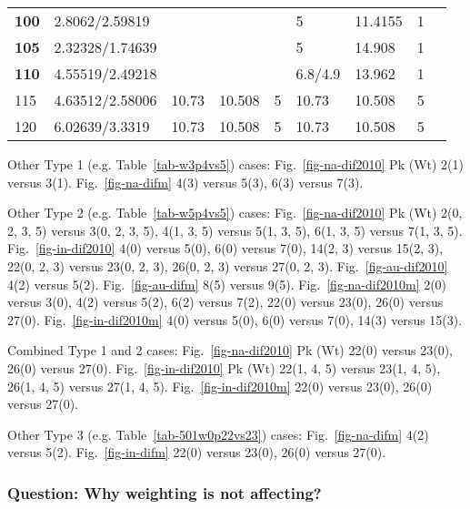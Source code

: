 \begin{table}[]
{\begin{tabular}{@{}llllllllll@{}}
\textbf{100} & 2.8062/2.59819 & \multicolumn{3}{l}{} & 5 & 11.4155 & 1 & \multicolumn{2}{l}{} \\
\textbf{105} & 2.32328/1.74639 & \multicolumn{3}{l}{} & 5 & 14.908 & 1 & \multicolumn{2}{l}{} \\
\textbf{110} & 4.55519/2.49218 & \multicolumn{3}{l}{} & 6.8/4.9 & 13.962 & 1 & \multicolumn{2}{l}{} \\
115 & 4.63512/2.58006 & 10.73 & 10.508 & 5 & 10.73 & 10.508 & 5 & \multicolumn{2}{l}{} \\
120 & 6.02639/3.3319 & 10.73 & 10.508 & 5 & 10.73 & 10.508 & 5 & \multicolumn{2}{l}{} \\ \cmidrule(r){1-8}
\end{tabular}%
}
\end{table}

Other Type 1 (e.g. Table~\ref{tab-w3p4vs5}) cases: Fig.~\ref{fig-na-dif2010}
Pk (Wt) 2(1) versus 3(1). Fig.~\ref{fig-na-difm} 4(3) versus 5(3), 6(3) versus 7(3).

Other Type 2 (e.g. Table~\ref{tab-w5p4vs5}) cases: Fig.~\ref{fig-na-dif2010}
Pk (Wt) 2(0, 2, 3, 5) versus 3(0, 2, 3, 5), 4(1, 3, 5) versus 5(1, 3, 5), 6(1,
3, 5) versus 7(1, 3, 5). Fig.~\ref{fig-in-dif2010} 4(0) versus 5(0),
6(0) versus 7(0), 14(2, 3) versus 15(2, 3), 22(0, 2, 3) versus 23(0, 2, 3),
26(0, 2, 3) versus 27(0, 2, 3). Fig.~\ref{fig-au-dif2010} 4(2) versus 5(2).
Fig.~\ref{fig-au-difm} 8(5) versus 9(5). Fig.~\ref{fig-na-dif2010m} 2(0)
versus 3(0), 4(2) versus 5(2), 6(2) versus 7(2), 22(0) versus
23(0), 26(0) versus 27(0).
Fig.~\ref{fig-in-dif2010m} 4(0) versus 5(0), 6(0)
versus 7(0), 14(3) versus 15(3).

Combined Type 1 and 2 cases: Fig.~\ref{fig-na-dif2010} Pk (Wt)
22(0) versus 23(0), 26(0) versus 27(0).
Fig.~\ref{fig-in-dif2010} Pk (Wt) 22(1, 4, 5) versus 23(1, 4, 5), 26(1, 4, 5) versus
27(1, 4, 5). Fig.~\ref{fig-in-dif2010m} 22(0) versus 23(0),
26(0) versus 27(0).

Other Type 3 (e.g. Table~\ref{tab-501w0p22vs23}) cases: Fig.~\ref{fig-na-difm}
4(2) versus 5(2). Fig.~\ref{fig-in-difm} 22(0)
versus 23(0), 26(0) versus 27(0).


\subsubsection{Question: Why weighting is not affecting?}

